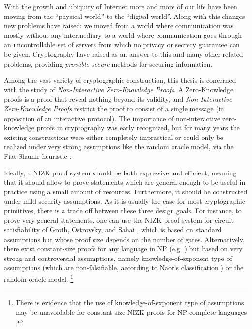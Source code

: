 With the growth and ubiquity of Internet more and more of our life have been moving from the ``physical world'' to the ``digital world''. Along with this changes new problems have raised: we moved from a world where communication was mostly without any intermediary to a world where communication goes through an uncontrollable set of servers from which no privacy or secrecy guarantee can be given. Cryptography have raised as an answer to this and many other related problems, providing \emph{provable secure} methods for securing information.  

Among the vast variety of cryptographic construction, this thesis is concerned with the study of \emph{Non-Interactive Zero-Knowledge Proofs}.
A Zero-Knowledge proofs is a proof that reveal nothing beyond its validity, and \emph{Non-Interactive Zero-Knowledge Proofs} restrict the proof to consist of a single message (in opposition of an interactive protocol).
The importance of non-interactive zero-knowledge proofs in cryptography was early recognized, but for many years the existing constructions were either completely impractical or could only be realized under very strong assumptions like the random oracle model, via the Fiat-Shamir heuristic \cite{C:FiaSha86}. 

Ideally, a NIZK proof system should be both expressive and efficient, meaning that it should allow to prove
statements which are general enough to be useful in practice using a small amount of resources.
Furthermore, it should be constructed under
mild security assumptions.
As it is usually the case for most cryptographic primitives, there is a trade off between these three design goals.
For instance,
to prove very general statements, one can use the NIZK proof 
system for circuit satisfiability of Groth, Ostrovsky, and Sahai 
\cite{EC:GroOstSah06}, which is based on standard assumptions but 
whose proof size depends on the number of gates. 
Alternatively,
there exist constant-size proofs for any language in NP
  (e.g. \cite{EC:GGPR13}) but based on very strong and controversial assumptions, 
  namely knowledge-of-exponent type of assumptions 
  (which are non-falsifiable, according to Naor's classification 
  \cite{C:Naor03}) or the random oracle model. 
\footnote{There is evidence that the use of knowledge-of-exponent type of  assumptions 
may be unavoidable for constant-size NIZK proofs for NP-complete languages \cite{STOC:GenWic11}.}

